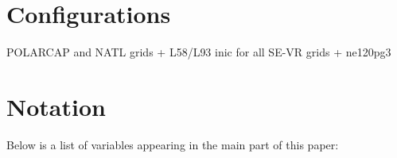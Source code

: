 \documentclass[draft]{agujournal2019}
\begin{document}
\section{Configurations}
POLARCAP and NATL grids + L58/L93 inic for all SE-VR grids + ne120pg3
\section{Notation}\label{app9:notation}

%
%
%
%
%
%
%

Below is a list of variables appearing in the main part of this paper:
\end{document}
